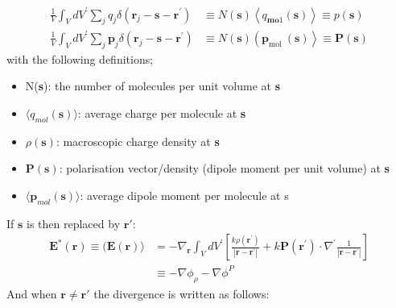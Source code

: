 \begin{equation}
    \begin{aligned}
    \frac{1}{V} \int_{V} d V^{\prime} \sum_{j} q_{j} \delta\left(\mathbf{r}_{j}-\mathbf{s}-\mathbf{r}^{\prime}\right) & \equiv N(\mathbf{s})\left\langle q_{\mathbf{m} \mathbf{o} 1}(\mathbf{s})\right\rangle \equiv p(\mathbf{s}) \\
    \frac{1}{V} \int_{V} d V^{\prime} \sum_{j} \mathbf{p}_{j} \delta\left(\mathbf{r}_{j}-\mathbf{s}-\mathbf{r}^{\prime}\right) & \equiv N(\mathbf{s})\left(\mathbf{p}_{\text {mol }}(\mathbf{s})\right\rangle \equiv \mathbf{P}(\mathbf{s})
    \end{aligned}
\end{equation}
with the following definitions;
\begin{itemize}
    \item N(\textbf{s}): the number of molecules per unit volume at \textbf{s}
    \item $\langle q_{mol}(\textbf{s}) \rangle$: average charge per molecule at \textbf{s}
    \item $\rho (\textbf{s})$: macroscopic charge density at \textbf{s}
    \item $\textbf{P}(\textbf{s})$: polarisation vector/density (dipole moment per unit volume) at \textbf{s}
    \item $\langle \textbf{p}_{mol}(\textbf{s}) \rangle  $: average dipole moment per molecule at s
\end{itemize}
If $\textbf{s}$ is then replaced by $\textbf{r}'$:
\begin{equation}
    \begin{aligned}
    \mathbf{E}^{*}(\mathbf{r}) \equiv(\mathbf{E}(\mathbf{r})\rangle &=-\nabla_{\mathbf{r}} \int_{V} d V^{\prime}\left[\frac{k \rho\left(\mathbf{r}^{\prime}\right)}{\left|\mathbf{r}-\mathbf{r}^{\prime}\right|}+k \mathbf{P}\left(\mathbf{r}^{\prime}\right) \cdot \nabla^{\prime} \frac{1}{\left|\mathbf{r}-\mathbf{r}^{\prime}\right|}\right] \\
    & \equiv-\nabla \phi_{\rho}-\nabla \phi^{P}
    \end{aligned}
\end{equation}
And when $\textbf{r} \neq \textbf{r}'$ the divergence is written as follows:
